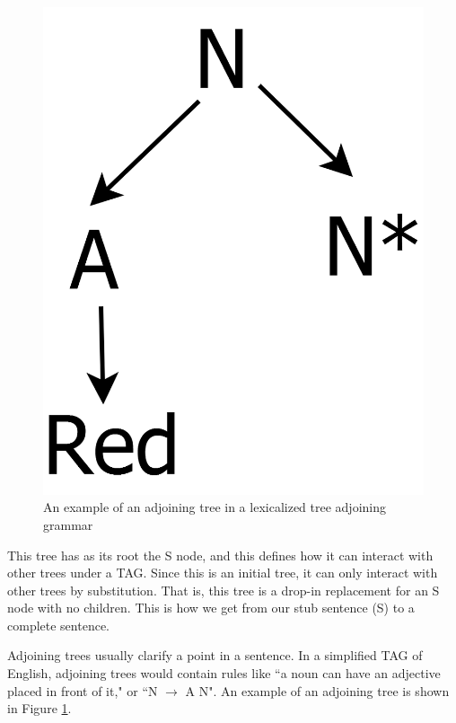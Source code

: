 \begin{figure}[ht]
\begin{minipage}[b]{0.45\linewidth}
\includegraphics[width=\linewidth]{adjoining-tree-example.png}
\caption{An example of an adjoining tree in a lexicalized tree adjoining grammar}
\label{adjoining-tree-example}
\end{minipage}
\end{figure}

This tree has as its root the S node, and this defines how it can interact with other
trees under a TAG.  Since this is an initial tree, it can only interact with other trees by
substitution.  That is, this tree is a drop-in replacement for an S node with no children.
This is how we get from our stub sentence (S) to a complete sentence.

Adjoining trees usually clarify a point in a sentence.  In a simplified TAG of English, adjoining
trees would contain rules like ``a noun can have an adjective placed in front of it," or ``N $\rightarrow$ A N".
An example of an adjoining tree is shown in Figure \ref{adjoining-tree-example}.


